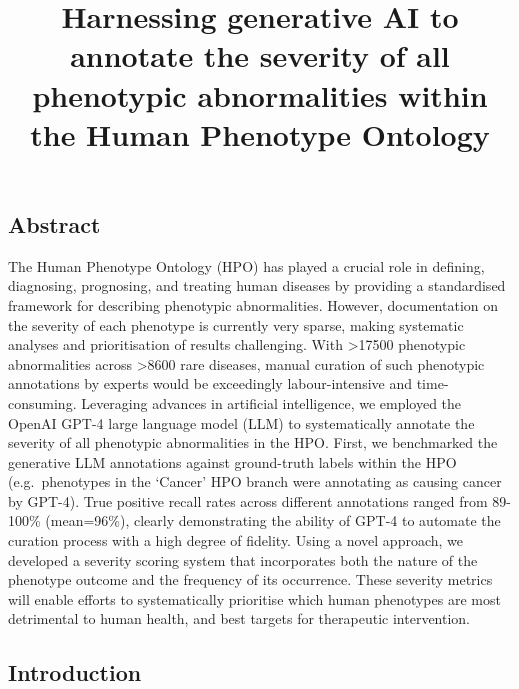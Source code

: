 \documentclass[
]{agujournal2019}
\begin{document}
\title{Harnessing generative AI to annotate the severity of all
phenotypic abnormalities within the Human Phenotype Ontology}







\subsection{Abstract}\label{abstract}

The Human Phenotype Ontology (HPO) has played a crucial role in
defining, diagnosing, prognosing, and treating human diseases by
providing a standardised framework for describing phenotypic
abnormalities. However, documentation on the severity of each phenotype
is currently very sparse, making systematic analyses and prioritisation
of results challenging. With \textgreater17500 phenotypic abnormalities
across \textgreater8600 rare diseases, manual curation of such
phenotypic annotations by experts would be exceedingly labour-intensive
and time-consuming. Leveraging advances in artificial intelligence, we
employed the OpenAI GPT-4 large language model (LLM) to systematically
annotate the severity of all phenotypic abnormalities in the HPO. First,
we benchmarked the generative LLM annotations against ground-truth
labels within the HPO (e.g.~phenotypes in the `Cancer' HPO branch were
annotating as causing cancer by GPT-4). True positive recall rates
across different annotations ranged from 89-100\% (mean=96\%), clearly
demonstrating the ability of GPT-4 to automate the curation process with
a high degree of fidelity. Using a novel approach, we developed a
severity scoring system that incorporates both the nature of the
phenotype outcome and the frequency of its occurrence. These severity
metrics will enable efforts to systematically prioritise which human
phenotypes are most detrimental to human health, and best targets for
therapeutic intervention.

\subsection{Introduction}\label{introduction}
\end{document}
